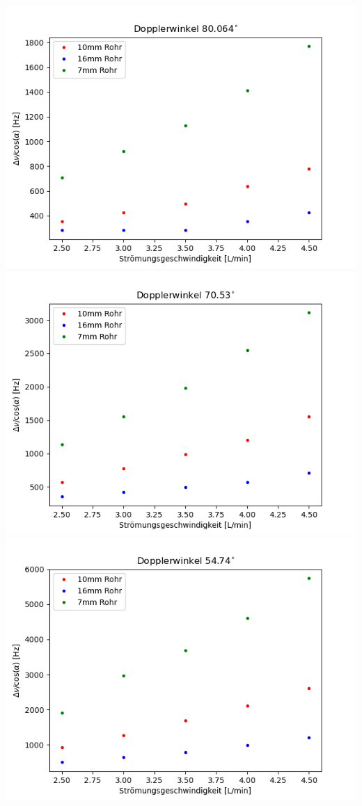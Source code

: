 \documentclass[titlepage=firstcover, captions=tableheading]{scrartcl}
\begin{document}
\includegraphics{1.png}
\includegraphics{2.png}
\includegraphics{3.png}
\end{document}
